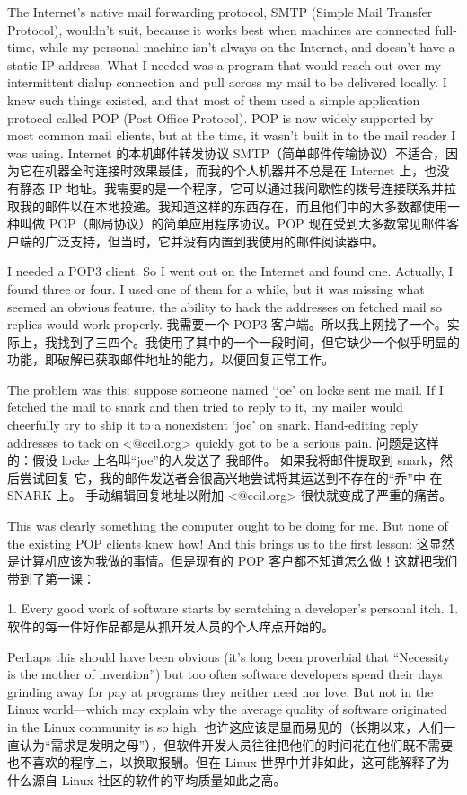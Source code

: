 \documentclass[a4paper,12pt,UTF8,twoside]{ctexbook}
\begin{document}
The Internet's native mail forwarding protocol, SMTP (Simple Mail Transfer Protocol), wouldn't suit, because it works best when machines are connected full-time, while my personal machine isn't always on the Internet, and doesn't have a static IP address. What I needed was a program that would reach out over my intermittent dialup connection and pull across my mail to be delivered locally. I knew such things existed, and that most of them used a simple application protocol called POP (Post Office Protocol). POP is now widely supported by most common mail clients, but at the time, it wasn't built in to the mail reader I was using.
Internet 的本机邮件转发协议 SMTP（简单邮件传输协议）不适合，因为它在机器全时连接时效果最佳，而我的个人机器并不总是在 Internet 上，也没有静态 IP 地址。我需要的是一个程序，它可以通过我间歇性的拨号连接联系并拉取我的邮件以在本地投递。我知道这样的东西存在，而且他们中的大多数都使用一种叫做 POP（邮局协议）的简单应用程序协议。POP 现在受到大多数常见邮件客户端的广泛支持，但当时，它并没有内置到我使用的邮件阅读器中。

I needed a POP3 client. So I went out on the Internet and found one. Actually, I found three or four. I used one of them for a while, but it was missing what seemed an obvious feature, the ability to hack the addresses on fetched mail so replies would work properly.
我需要一个 POP3 客户端。所以我上网找了一个。实际上，我找到了三四个。我使用了其中的一个一段时间，但它缺少一个似乎明显的功能，即破解已获取邮件地址的能力，以便回复正常工作。

The problem was this: suppose someone named `joe' on locke sent me mail. If I fetched the mail to snark and then tried to reply to it, my mailer would cheerfully try to ship it to a nonexistent `joe' on snark. Hand-editing reply addresses to tack on <@ccil.org> quickly got to be a serious pain.
问题是这样的：假设 locke 上名叫“joe”的人发送了 我邮件。 如果我将邮件提取到 snark，然后尝试回复 它，我的邮件发送者会很高兴地尝试将其运送到不存在的“乔”中 在 SNARK 上。 手动编辑回复地址以附加 <@ccil.org> 很快就变成了严重的痛苦。

This was clearly something the computer ought to be doing for me. But none of the existing POP clients knew how! And this brings us to the first lesson:
这显然是计算机应该为我做的事情。但是现有的 POP 客户都不知道怎么做！这就把我们带到了第一课：

1. Every good work of software starts by scratching a developer's personal itch.
1. 软件的每一件好作品都是从抓开发人员的个人痒点开始的。

Perhaps this should have been obvious (it's long been proverbial that ``Necessity is the mother of invention'') but too often software developers spend their days grinding away for pay at programs they neither need nor love. But not in the Linux world—which may explain why the average quality of software originated in the Linux community is so high.
也许这应该是显而易见的（长期以来，人们一直认为“需求是发明之母”），但软件开发人员往往把他们的时间花在他们既不需要也不喜欢的程序上，以换取报酬。但在 Linux 世界中并非如此，这可能解释了为什么源自 Linux 社区的软件的平均质量如此之高。
\end{document}
